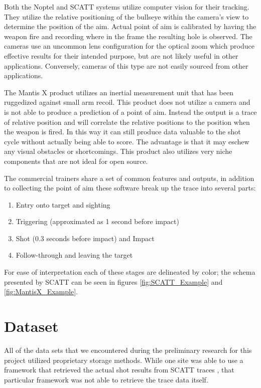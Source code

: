 \documentclass[conference]{IEEEtran}
\begin{document}
Both the Noptel and SCATT systems utilize computer vision for their tracking.
They utilize the relative positioning of the bullseye within the camera's view to determine the position of the aim.
Actual point of aim is calibrated by having the weapon fire and recording where in the frame the resulting hole is observed.
The cameras use an uncommon lens configuration for the optical zoom which produce effective results for their intended purpose, but are not likely useful in other applications.
Conversely, cameras of this type are not easily sourced from other applications.

The Mantis X \cite{mantisx} product utilizes an inertial measurement unit that has been ruggedized against small arm recoil. 
This product does not utilize a camera and is not able to produce a prediction of a point of aim.
Instead the output is a trace of relative position and will correlate the relative positions to the position when the weapon is fired.
In this way it can still produce data valuable to the shot cycle without actually being able to score.
The advantage is that it may eschew any visual obstacles or shortcomings.
This product also utilizes very niche components that are not ideal for open source.

The commercial trainers share a set of common features and outputs,
in addition to collecting the point of aim these software break up the trace into several parts:
\begin{enumerate}
	\item Entry onto target and sighting
	\item Triggering (approximated as 1 second before impact)
	\item Shot (0.3 seconds before impact)  and Impact
	\item Follow-through and leaving the target
\end{enumerate}
For ease of interpretation each of these stages are delineated by color; the schema presented by SCATT can be seen in figures 
\ref{fig:SCATT_Example} and
\ref{fig:MantisX_Example}.


\section{Dataset}

All of the data sets that we encountered during the preliminary research for this project utilized proprietary storage methods.
While one site was able to use a framework that retrieved the actual shot results from SCATT traces \cite{scatt-db}, that particular framework was not able to retrieve the trace data itself.
\end{document}
